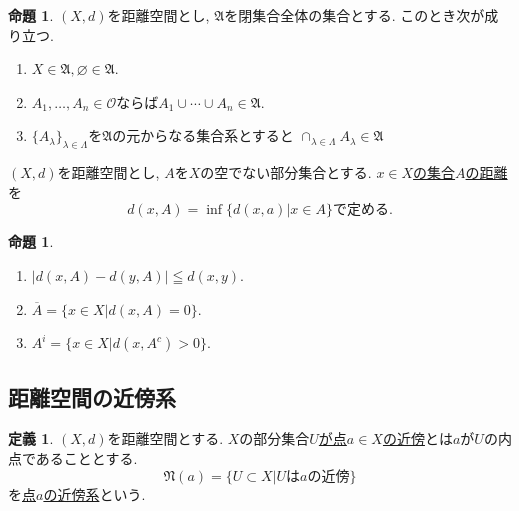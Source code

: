 \documentclass[dvipdfmx,a4paper,11pt]{article}
\theoremstyle{definition}
\newtheorem{prop}[thm]{命題}
\newtheorem{dfn}[thm]{定義}
\begin{document}
 \begin{tcolorbox}[
    colback = white,
    colframe = green!35!black,
    fonttitle = \bfseries,
    breakable = true]
    \begin{prop}
    \text{}
 $(X,d)$を距離空間とし, $\mathfrak{A}$を閉集合全体の集合とする. このとき次が成り立つ.
    \begin{enumerate}
     \setlength{\parskip}{0cm} 
  \setlength{\itemsep}{0cm} 
    \item $X \in \mathfrak{A}, \varnothing \in \mathfrak{A}$.
    \item $A_1, \ldots, A_n \in \mathscr{O}$ならば$A_1 \cup \cdots \cup A_n \in \mathfrak{A}$.
    \item $\{ A_{\lambda} \}_{\lambda \in \Lambda}$を$\mathfrak{A}$の元からなる集合系とすると
    $\cap_{ \lambda \in \Lambda  }A_{\lambda} \in \mathfrak{A}$
    \end{enumerate}
  \end{prop}
 \end{tcolorbox}
 
 $(X,d)$を距離空間とし, $A$を$X$の空でない部分集合とする.
 \underline{$x \in X$の集合$A$の距離}を
 $$
 d(x,A) = \inf \{ d(x,a) | x \in A\} \text{で定める.}
 $$
 
  \begin{tcolorbox}[
    colback = white,
    colframe = green!35!black,
    fonttitle = \bfseries,
    breakable = true]
    \begin{prop}
    \text{}
    \begin{enumerate}
     \setlength{\parskip}{0cm} 
  \setlength{\itemsep}{0cm} 
    \item $|d(x,A) - d(y,A)| \leqq d(x,y)$.
    \item $\overline{A} = \{ x \in X | d(x,A)=0\}$.
    \item $A^i =  \{ x \in X | d(x,A^{c})>0\}$.
    \end{enumerate}
  \end{prop}
 \end{tcolorbox}
 
 \subsection{距離空間の近傍系}
 
 
  \begin{tcolorbox}[
    colback = white,
    colframe = green!35!black,
    fonttitle = \bfseries,
    breakable = true]
    \begin{dfn}
    \text{}
$(X,d)$を距離空間とする. $X$の部分集合\underline{$U$が点$a \in X$の近傍}とは$a$が$U$の内点であることとする.
$$
\mathfrak{N}(a) = \{ U \subset X | \text{$U$は$a$の近傍} \}
$$
を\underline{点$a$の近傍系}という.
  \end{dfn}
 \end{tcolorbox}
 
\end{document}
